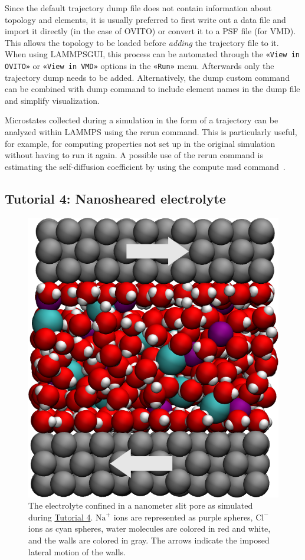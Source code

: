 \documentclass[9pt,tutorial]{livecoms}
\newcommand{\lmpcmd}[1]{\colorbox{listing}{\textcolor{command}{\small{#1}}}} %
\newcommand{\guicmd}[1]{\textcolor{command}{\texttt{«#1»}}} %
\newcommand{\lammpsgui}{\textsf{LAMMPS\textendash GUI}}
\begin{document}
\begin{note}
  Since the default trajectory dump file does not contain information about
  topology and elements, it is usually preferred to first write out a
  data file and import it directly (in the case of OVITO) or convert it
  to a PSF file (for VMD).  This allows the topology to be loaded before
  \emph{adding} the trajectory file to it.  When using \lammpsgui{},
  this process can be automated through the \guicmd{View in OVITO} or
  \guicmd{View in VMD} options in the \guicmd{Run} menu.  Afterwards
  only the trajectory dump needs to be added.  Alternatively, the
  \lmpcmd{dump custom} command can be combined with \lmpcmd{dump} command to
  include element names in the dump file and simplify visualization.
\end{note}

\begin{note}
  Microstates collected during a simulation in the form of a trajectory
  can be analyzed within LAMMPS using the \lmpcmd{rerun} command.  This is
  particularly useful, for example, for computing properties not set up in
  the original simulation without having to run it again.  A possible use of
  the \lmpcmd{rerun} command is estimating the self-diffusion coefficient
  by using the \lmpcmd{compute msd} command~\cite{frenkel2023understanding}.
\end{note}

\subsection{Tutorial 4: Nanosheared electrolyte}
\label{sheared-confined-label}

\begin{figure}
\centering
\includegraphics[width=0.55\linewidth]{NANOSHEAR}
\caption{The electrolyte confined in a nanometer slit pore as simulated during
\hyperref[sheared-confined-label]{Tutorial 4}.  $\text{Na}^+$ ions are represented
as purple spheres, $\text{Cl}^-$ ions as cyan spheres, water molecules are colored
in red and white, and the walls are colored in gray.  The arrows indicate the
imposed lateral motion of the walls.}
\label{fig:NANOSHEAR}
\end{figure}
\end{document}
